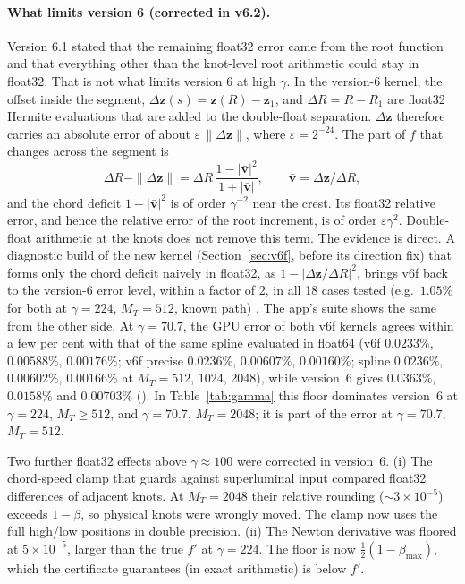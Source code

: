 \documentclass[11pt, a4paper]{article}
\begin{document}
\paragraph{What limits version 6 (corrected in v6.2).} Version 6.1 stated that the remaining float32 error came from the root function and that everything other than the knot-level root arithmetic could stay in float32. That is not what limits version 6 at high $\gamma$. In the version-6 kernel, the offset inside the segment, $\Delta\mathbf{z}(s) = \mathbf{z}(R) - \mathbf{z}_1$, and $\Delta R = R - R_1$ are float32 Hermite evaluations that are added to the double-float separation. $\Delta\mathbf{z}$ therefore carries an absolute error of about $\varepsilon\,\|\Delta\mathbf{z}\|$, where $\varepsilon = 2^{-24}$. The part of $f$ that changes across the segment is
\[
\Delta R - \|\Delta\mathbf{z}\| = \Delta R\,\frac{1 - |\bar{\mathbf{v}}|^2}{1 + |\bar{\mathbf{v}}|}, \qquad \bar{\mathbf{v}} = \Delta\mathbf{z}/\Delta R,
\]
and the chord deficit $1 - |\bar{\mathbf{v}}|^2$ is of order $\gamma^{-2}$ near the crest. Its float32 relative error, and hence the relative error of the root increment, is of order $\varepsilon\gamma^2$. Double-float arithmetic at the knots does not remove this term. The evidence is direct. A diagnostic build of the new kernel (Section~\ref{sec:v6f}, before its direction fix) that forms only the chord deficit naively in float32, as $1 - |\Delta\mathbf{z}/\Delta R|^2$, brings v6f back to the version-6 error level, within a factor of 2, in all 18 cases tested (e.g.\ $1.05\%$ for both at $\gamma = 224$, $M_T = 512$, known path) \cite{swarm2026}. The app's suite shows the same from the other side. At $\gamma = 70.7$, the GPU error of both v6f kernels agrees within a few per cent with that of the same spline evaluated in float64 (v6f $0.0233\%$, $0.00588\%$, $0.00176\%$; v6f precise $0.0236\%$, $0.00607\%$, $0.00160\%$; spline $0.0236\%$, $0.00602\%$, $0.00166\%$ at $M_T = 512$, 1024, 2048), while version~6 gives $0.0363\%$, $0.0158\%$ and $0.00703\%$ (). In Table~\ref{tab:gamma} this floor dominates version~6 at $\gamma = 224$, $M_T \ge 512$, and $\gamma = 70.7$, $M_T = 2048$; it is part of the error at $\gamma = 70.7$, $M_T = 512$.

Two further float32 effects above $\gamma \approx 100$ were corrected in version~6. (i) The chord-speed clamp that guards against superluminal input compared float32 differences of adjacent knots. At $M_T = 2048$ their relative rounding ($\sim\!3\times10^{-5}$) exceeds $1 - \beta$, so physical knots were wrongly moved. The clamp now uses the full high/low positions in double precision. (ii) The Newton derivative was floored at $5\times10^{-5}$, larger than the true $f'$ at $\gamma = 224$. The floor is now $\tfrac12(1 - \beta_{\max})$, which the certificate guarantees (in exact arithmetic) is below $f'$.
\end{document}
